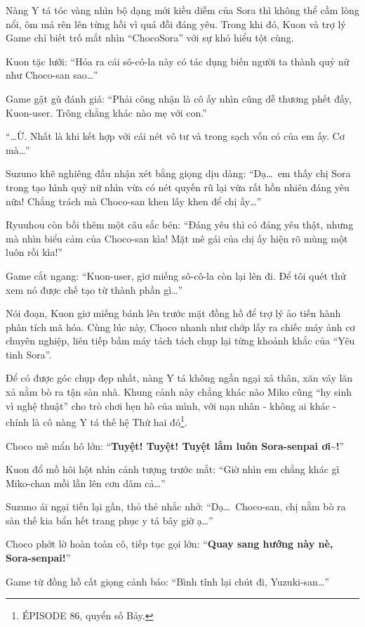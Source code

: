 \documentclass[../main.tex]{subfiles}
\begin{document}
Nàng Y tá tóc vàng nhìn bộ dạng mới kiều diễm của Sora thì không thể cầm lòng nổi, ôm má rên lên từng hồi vì quá đỗi đáng yêu. Trong khi đó, Kuon và trợ lý Game chỉ biết trố mắt nhìn ``ChocoSora'' với sự khó hiểu tột cùng.

Kuon tặc lưỡi: ``Hóa ra cái sô-cô-la này có tác dụng biến người ta thành quỷ nữ như Choco-san sao\dots''

Game gật gù đánh giá: ``Phải công nhận là cô ấy nhìn cũng dễ thương phết đấy, Kuon-user. Trông chẳng khác nào mẹ với con.''

``\dots Ừ. Nhất là khi kết hợp với cái nét vô tư và trong sạch vốn có của em ấy. Cơ mà\dots''

Suzuno khẽ nghiêng đầu nhận xét bằng giọng dịu dàng: ``Dạ\dots\ em thấy chị Sora trong tạo hình quỷ nữ nhìn vừa có nét quyến rũ lại vừa rất hồn nhiên đáng yêu nữa! Chẳng trách mà Choco-san khen lấy khen để chị ấy\dots''

Ryuuhou còn bồi thêm một câu sắc bén: ``Đáng yêu thì có đáng yêu thật, nhưng mà nhìn biểu cảm của Choco-san kìa! Mặt mê gái của chị ấy hiện rõ mùng một luôn rồi kìa!''

Game cắt ngang: ``Kuon-user, giơ miếng sô-cô-la còn lại lên đi. Để tôi quét thử xem nó được chế tạo từ thành phần gì\dots''

Nói đoạn, Kuon giơ miếng bánh lên trước mặt đồng hồ để trợ lý ảo tiến hành phân tích mã hóa. Cùng lúc này, Choco nhanh như chớp lấy ra chiếc máy ảnh cơ chuyên nghiệp, liên tiếp bấm máy tách tách chụp lại từng khoảnh khắc của ``Yêu tinh Sora''.

Để có được góc chụp đẹp nhất, nàng Y tá không ngần ngại xả thân, xăn váy lăn xả nằm bò ra tận sàn nhà. Khung cảnh này chẳng khác nào Miko cũng ``hy sinh vì nghệ thuật'' cho trò chơi hẹn hò của mình, với nạn nhân - không ai khác - chính là cô nàng Y tá thế hệ Thứ hai đó\footnote{{\flaregothic ÉPISODE 86}, quyển số Bảy.}.

Choco mê mẩn hô lớn: ``\textbf{Tuyệt! Tuyệt! Tuyệt lắm luôn Sora-senpai ơi\~{}!}''

Kuon đổ mồ hôi hột nhìn cảnh tượng trước mắt: ``Giờ nhìn em chẳng khác gì Miko-chan mỗi lần lên cơn dâm cả\dots''

Suzuno ái ngại tiến lại gần, thỏ thẻ nhắc nhở: ``Dạ\dots\ Choco-san, chị nằm bò ra sàn thế kia bẩn hết trang phục y tá bây giờ ạ\dots''

Choco phớt lờ hoàn toàn cô, tiếp tục gọi lớn: ``\textbf{Quay sang hướng này nè, Sora-senpai!}''

Game từ đồng hồ cất giọng cảnh báo: ``Bình tĩnh lại chút đi, Yuzuki-san\dots''
\end{document}

